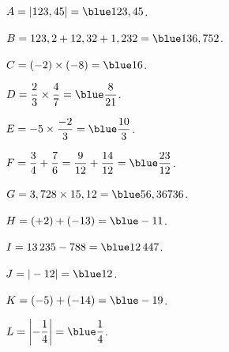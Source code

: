 \begin{corrige}
\ \\
   \vspace*{-9mm}
   \begin{multicols}{2}
      \begin{bigenumerate}
         \item $A =|123,45| ={\blue 123,45}$. \\ [3mm]
         \item $B =123,2+12,32+1,232 ={\blue 136,752}$. \\ [3mm]
         \item $C =(-2)\times(-8) ={\blue 16}$. \\ [3mm]
         \item $D =\dfrac{2}{3}\times\dfrac{4}{7} = {\blue \dfrac{8}{21}}$. \\ [3mm]
         \item $E =-5\times\dfrac{-2}{3} ={\blue \dfrac{10}{3}}$. \\ [3mm]
         \item $F=\dfrac{3}{4}+\dfrac{7}{6} =\dfrac{9}{12}+\dfrac{14}{12} ={\blue \dfrac{23}{12}}$. \\ [3mm]   
         \item $G =3,728\times15,12 ={\blue 56,36736}$. \\ [3mm]
         \item $H =(+2)+(-13) ={\blue -11}$. \\ [3mm]
         \item $I =13\,235-788 ={\blue 12\,447}$. \\ [3mm]
         \item $J =|-12| ={\blue 12}$. \\ [3mm]
         \item $K =(-5)+(-14) ={\blue -19}$. \\ [3mm]
         \item $L =\left|-\dfrac14\right| ={\blue \dfrac14}$.
      \end{bigenumerate}
   \end{multicols}
\end{corrige}


\bigskip


